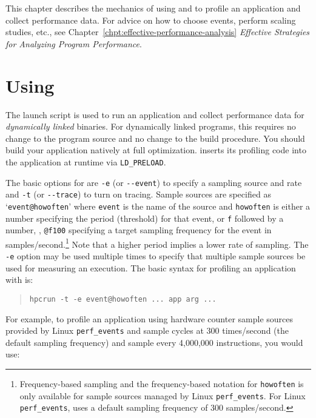 
This chapter describes the mechanics of using \hpcrun{} and \hpclink{}
to profile an application and collect performance data.  For advice on
how to choose events, perform scaling studies, etc., see
Chapter~\ref{chpt:effective-performance-analysis} {\it Effective
Strategies for Analyzing Program Performance}.

\section{Using \hpcrun{}}

The \hpcrun{} launch script is used to run an application and collect
performance data for {\it dynamically linked\/} binaries.  For
dynamically linked programs, this requires no change to the program
source and no change to the build procedure.  You should build your
application natively at full optimization.  \hpcrun{} inserts its
profiling code into the application at runtime via \verb|LD_PRELOAD|.

The basic options for \hpcrun{} are \verb|-e| (or \verb|--event|) to
specify a sampling source and rate and \verb|-t| (or \verb|--trace|) to
turn on tracing.  Sample sources are specified as `\verb|event@howoften|'
where \verb|event| is the name of the source and \verb|howoften| is either
a number specifying the period (threshold) for that event, or \verb|f| followed by a number, \eg{}, \verb|@f100| 
specifying a target sampling frequency for the event in samples/second.\footnote{Frequency-based sampling and 
the frequency-based notation for {\tt howoften} is only
available for sample sources managed by Linux {\tt perf\_events}. For Linux {\tt perf\_events}, \HPCToolkit{} uses 
a default sampling frequency of 300 samples/second.}
Note that a higher period implies a lower rate of sampling.  
The \verb|-e| option may be used multiple times to specify that multiple
sample sources be used for measuring an execution.  
The basic syntax for profiling an application with
\hpcrun{} is:

\begin{quote}
\begin{verbatim}
hpcrun -t -e event@howoften ... app arg ...
\end{verbatim}
\end{quote}

For example, to profile an application using hardware counter sample sources
provided by Linux \verb|perf_events| and sample cycles at 300 times/second (the default sampling frequency) and sample every 4,000,000 instructions, 
you would use:

